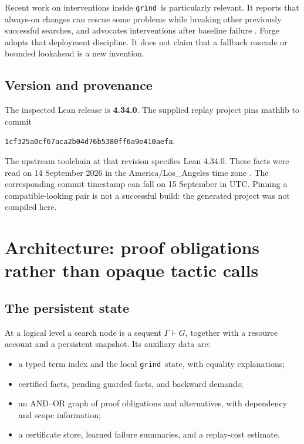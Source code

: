 \documentclass[11pt,a4paper]{article}
\newcommand{\grind}{\texttt{grind}}
\newcommand{\code}[1]{\texttt{\small #1}}
\begin{document}
Recent work on interventions inside \grind\ is particularly relevant. It
reports that always-on changes can rescue some problems while breaking other
previously successful searches, and advocates interventions after baseline
failure \cite{interventions}. Forge adopts that deployment discipline. It does
not claim that a fallback cascade or bounded lookahead is a new invention.

\subsection{Version and provenance}

The inspected Lean release is \textbf{4.34.0}. The supplied replay project pins
mathlib to commit
\begin{center}
\code{1cf325a0cf67aca2b04d76b5380ff6a9e410aefa}.
\end{center}
The upstream toolchain at that revision specifies Lean 4.34.0. These facts were
read on 14 September 2026 in the America/Los\_Angeles time zone
\cite{lean-release,mathlib-revision}. The corresponding commit timestamp can
fall on 15 September in UTC. Pinning a compatible-looking pair is not a
successful build: the generated project was not compiled here.

\section{Architecture: proof obligations rather than opaque tactic calls}

\subsection{The persistent state}

At a logical level a search node is a sequent $\Gamma\vdash G$, together with a
resource account and a persistent snapshot. Its auxiliary data are:
\begin{itemize}
\item a typed term index and the local \grind\ state, with equality explanations;
\item certified facts, pending guarded facts, and backward demands;
\item an AND--OR graph of proof obligations and alternatives, with dependency
and scope information;
\item a certificate store, learned failure summaries, and a replay-cost estimate.
\end{itemize}
\end{document}
